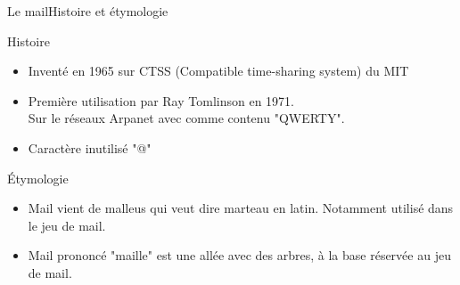 \documentclass{beamer}
\begin{document}
\begin{frame}{Le mail}{Histoire et étymologie}
    \begin{block}{Histoire}
    \begin{itemize}
        \item{
            Inventé en 1965 sur CTSS (Compatible time-sharing system) du MIT
        }
        \item<2->{
            Première utilisation par Ray Tomlinson en 1971.\\
            Sur le réseaux Arpanet avec comme contenu "QWERTY".
        }
        \item<3->{
            Caractère inutilisé "@"
        }
    \end{itemize}
    \end{block}
    \begin{block}{\'Etymologie}
    \begin{itemize}
        \item<4-> {
         Mail vient de malleus qui veut dire marteau en latin.
         Notamment utilisé dans le jeu de mail.
        }
        \item<5-> {
        Mail prononcé "maille" est une allée avec des arbres, à la base réservée au jeu de mail.    
        }

    \end{itemize}
    \end{block}
\end{frame}
\end{document}
